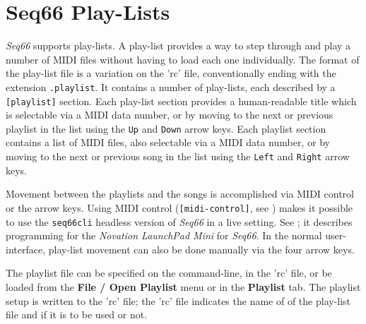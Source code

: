 %
%
%

\section{Seq66 Play-Lists}
\label{sec:playlist}

   \textsl{Seq66} supports play-lists.
   A play-list provides a way to step through and
   play a number of MIDI files without
   having to load each one individually.
   The format of the play-list file is a variation on the 'rc' file,
   conventionally ending with the extension \texttt{.playlist}.
   It contains a number of play-lists, each described by a
   \texttt{[playlist]} section.
   Each play-list section provides
   a human-readable title which is selectable via a MIDI data number,
   or by moving to the next or previous playlist in the list using the
   \texttt{Up} and \texttt{Down} arrow keys.
   Each playlist section contains a list of MIDI files, also selectable via a
   MIDI data number, or by moving to the next or previous song in the list
   using the \texttt{Left} and \texttt{Right} arrow keys.

   Movement between the playlists and the songs is accomplished via 
   MIDI control or the arrow keys.
   Using MIDI control (\texttt{[midi-control]}, see
   )
   makes it possible to use the \texttt{seq66cli}
   headless version of \textsl{Seq66} in a live setting.
   See ; it describes
   programming for the \textsl{Novation LaunchPad Mini} for
   \textsl{Seq66}.
   In the normal user-interface, play-list movement
   can also be done manually via the four arrow keys.

   The playlist file can be specified on the command-line, in
   the 'rc' file, or be loaded
   from the \textbf{File / Open Playlist} menu or in
   the \textbf{Playlist} tab.
   The playlist setup is written to the 'rc' file; the 'rc' file
   indicates the name of of the play-list file and if it is to be used
   or not.

